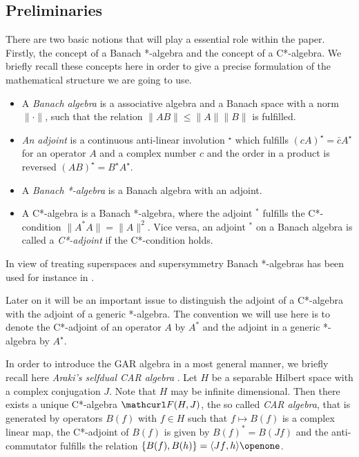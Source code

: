 \documentclass[pra,twoside,amsmath,amsfonts,amssymb,superscriptaddress,showpacs]{revtex4}
\def\9#1{{\mathcurl #1}}
\def\I{\openone}
\newcommand{\CAR}[2]{\9F(#1,#2)}
\newcommand{\SPROD}[2]{\langle{#1},{#2}\rangle}
\newcommand{\ACO}[2]{\{#1,#2\}}
\newcommand{\ADJ}{\star}
\begin{document}
\subsection{Preliminaries}
\label{subsec:prelim}
There are two basic notions that will play a essential role within the paper. Firstly, the concept
of a Banach *-algebra and the concept of a C*-algebra. We briefly recall these concepts here in
order to give a precise formulation of the mathematical structure we are going to use.
\begin{itemize}
\item 
A {\em Banach algebra} is a associative algebra and a Banach space with a norm $\|\cdot\|$, such
that the relation $\|AB\|\leq\|A\|\|B\|$ is fulfilled. 
\item
{\em An adjoint} is a continuous anti-linear involution $^\ADJ$ which fulfills
$(cA)^\ADJ=\bar c A^\ADJ$ for an operator $A$ and a complex number $c$ and the order in a product is
reversed $(AB)^\ADJ=B^\ADJ A^\ADJ$. 
\item 
A {\em Banach *-algebra} is a Banach algebra with an adjoint.
\item
A C*-algebra is a Banach *-algebra, where the adjoint $^*$ fulfills the C*-condition
$\|A^*A\|=\|A\|^2$. Vice versa, an adjoint $^*$ on a Banach algebra is called a {\em C*-adjoint} if
the C*-condition holds. 
\end{itemize}

In view of treating superspaces and supersymmetry Banach *-algebras has been used for instance in  
\cite{JadPil81}.

Later on it will be an important issue to distinguish the adjoint of a
C*-algebra with the adjoint of a generic *-algebra. The convention we will use here is to denote the
C*-adjoint of an operator $A$ by $A^*$
and the adjoint in a generic *-algebra by $A^\ADJ$.

In order to introduce the GAR algebra in a most general manner, we briefly recall here
{\em Araki's selfdual CAR algebra} \cite{MR0295702}. Let $H$ be a separable Hilbert space
with a complex conjugation $J$. Note that $H$ may be infinite dimensional. Then there exists a
unique C*-algebra $\CAR{H}{J}$, the so called {\em CAR algebra}, that is
generated by operators $B(f)$ with $f\in H$ such that $f\mapsto B(f)$ is a complex linear map, the
C*-adjoint of $B(f)$ is given by $B(f)^*=B(Jf)$ and the anti-commutator fulfills the relation
$\ACO{B(f)}{B(h)}=\SPROD{Jf}{h}\I$. 
\end{document}
